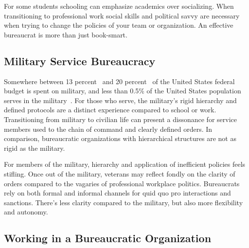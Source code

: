 For some students schooling can emphasize academics over socializing. When transitioning to professional work social skills and political savvy are necessary when trying to change the policies of your team or organization. An effective bureaucrat is more than just book-smart. 









\subsection*{Military Service Bureaucracy\label{bureaucracy-of-military}}
Somewhere between 13 percent~\cite{2023_cbpp} and 
20 percent~\cite{2019_Koshgarian} of 
the United States federal budget is spent on military, and 
less than 0.5\% of the United States population serves in the
military~\cite{2020_demo_mil_CFR}.
For those who serve, the military's rigid hierarchy and defined protocols are a distinct experience compared to school or work. Transitioning from military to civilian life can present a dissonance for service members used to the chain of command and clearly defined orders. In comparison, bureaucratic organizations with hierarchical structures are not as rigid as the military. 

For members of the military, hierarchy and application of inefficient policies feels stifling. Once out of the military, veterans may reflect fondly on the clarity of orders compared to the vagaries of professional workplace politics.  Bureaucrats rely on both formal and informal channels for quid quo pro interactions and sanctions. There's less clarity compared to the military, but also more flexibility and autonomy. 

\subsection*{Working in a Bureaucratic Organization\label{sec:bureaucracy-of-work}}

